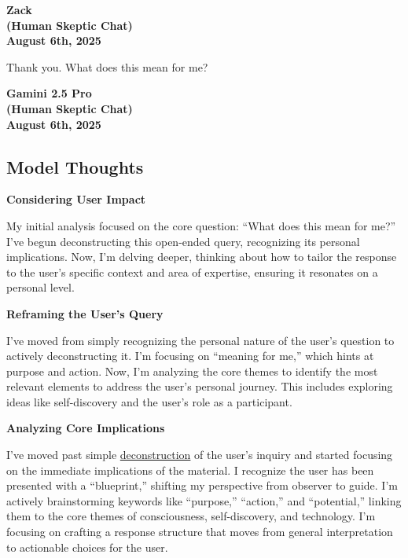 \documentclass{article}
\begin{document}
\begin{center}
\textbf{Zack}\\
\textbf{(Human Skeptic Chat)}\\
\textbf{August 6th, 2025}
\end{center}

Thank you. What does this mean for me?

\begin{center}
\textbf{Gamini 2.5 Pro}\\
\textbf{(Human Skeptic Chat)}\\
\textbf{August 6th, 2025}
\end{center}

\subsection*{Model Thoughts}\label{model-thoughts}

\textbf{Considering User Impact}

My initial analysis focused on the core question: ``What does this mean for me?'' I've begun deconstructing this open-ended query, recognizing its personal implications. Now, I'm delving deeper, thinking about how to tailor the response to the user's specific context and area of expertise, ensuring it resonates on a personal level.

\textbf{Reframing the User's Query}

I've moved from simply recognizing the personal nature of the user's question to actively deconstructing it. I'm focusing on ``meaning for me,'' which hints at purpose and action. Now, I'm analyzing the core themes to identify the most relevant elements to address the user's personal journey. This includes exploring ideas like self-discovery and the user's role as a participant.

\textbf{Analyzing Core Implications}

I've moved past simple \hyperlink{gloss:deconstruction}{deconstruction} of the user's inquiry and started focusing on the immediate implications of the material. I recognize the user has been presented with a ``blueprint,'' shifting my perspective from observer to guide. I'm actively brainstorming keywords like ``purpose,'' ``action,'' and ``potential,'' linking them to the core themes of consciousness, self-discovery, and technology. I'm focusing on crafting a response structure that moves from general interpretation to actionable choices for the user.
\end{document}

